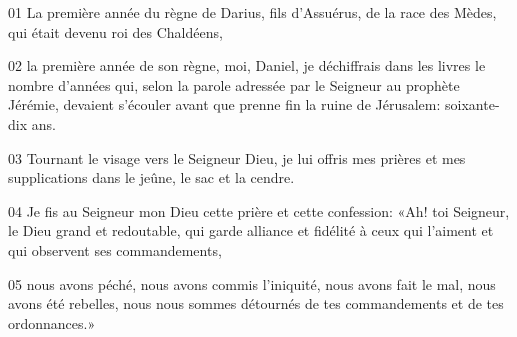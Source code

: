 01 La première année du règne de Darius, fils d’Assuérus, de la race des Mèdes, qui était devenu roi des Chaldéens,

02 la première année de son règne, moi, Daniel, je déchiffrais dans les livres le nombre d’années qui, selon la parole adressée par le Seigneur au prophète Jérémie, devaient s’écouler avant que prenne fin la ruine de Jérusalem: soixante-dix ans.

03 Tournant le visage vers le Seigneur Dieu, je lui offris mes prières et mes supplications dans le jeûne, le sac et la cendre.

04 Je fis au Seigneur mon Dieu cette prière et cette confession: «Ah! toi Seigneur, le Dieu grand et redoutable, qui garde alliance et fidélité à ceux qui l’aiment et qui observent ses commandements,

05 nous avons péché, nous avons commis l’iniquité, nous avons fait le mal, nous avons été rebelles, nous nous sommes détournés de tes commandements et de tes ordonnances.»